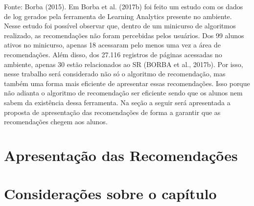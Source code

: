 Fonte: Borba (2015).
Em Borba et al. (2017b) foi feito um estudo com os dados de log gerados pela ferramenta de Learning Analytics presente no ambiente. Nesse estudo foi possível observar que, dentro de um minicurso de algoritmos realizado, as recomendações não foram percebidas pelos usuários. Dos 99 alunos ativos no minicurso, apenas 18 acessaram pelo menos uma vez a área de recomendações. Além disso, dos 27.116 registros de páginas acessadas no ambiente, apenas 30 estão relacionados ao SR (BORBA et al., 2017b).
Por isso, nesse trabalho será considerado não só o algoritmo de recomendação, mas também uma forma mais eficiente de apresentar essas recomendações. Isso porque não adianta o algoritmo de recomendação ser eficiente sendo que os alunos nem sabem da existência dessa ferramenta. Na seção a seguir será apresentada a proposta de apresentação das recomendações de forma a garantir que as recomendações chegem aos alunos.

\section{Apresentação das Recomendações}

\section{Considerações sobre o capítulo}
